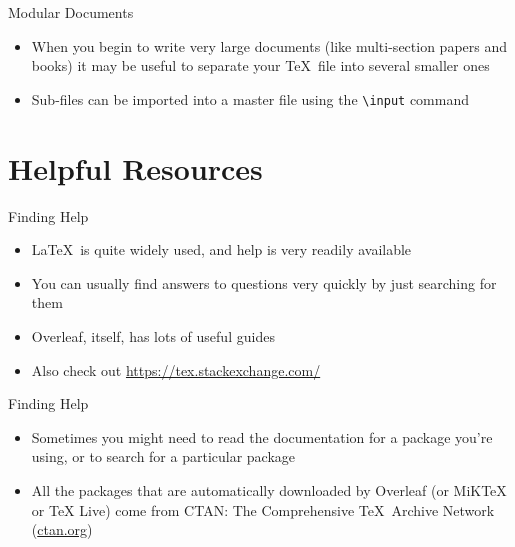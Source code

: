 \documentclass{beamer} %
\begin{document}
\begin{frame}{Modular Documents}

\begin{itemize}
	\item When you begin to write very large documents (like multi-section papers and books) it may be useful to separate your \TeX\ file into several smaller ones
	\item Sub-files can be imported into a master file using the \texttt{\textbackslash input} command
\end{itemize}

\end{frame}

\section{Helpful Resources}

\begin{frame}{Finding Help}

\begin{itemize}
	\item \LaTeX\ is quite widely used, and help is very readily available
	\item You can usually find answers to questions very quickly by just searching for them
	\item Overleaf, itself, has lots of useful guides
	\item Also check out \url{https://tex.stackexchange.com/}
\end{itemize}

\end{frame}

\begin{frame}{Finding Help}

\begin{itemize}
	\item Sometimes you might need to read the documentation for a package you're using, or to search for a particular package
	\item All the packages that are automatically downloaded by Overleaf (or MiKTeX or TeX Live) come from CTAN: The Comprehensive \TeX\ Archive Network (\url{ctan.org})
\end{itemize}

\end{frame}
\end{document}
